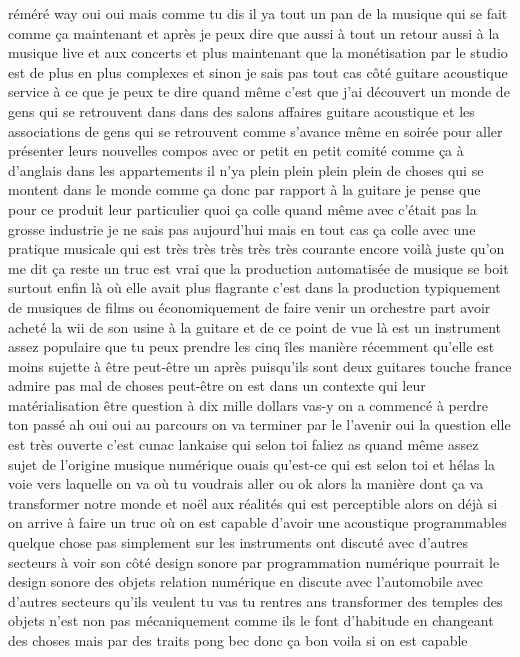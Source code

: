  réméré way oui oui mais comme tu dis il ya tout un pan de la musique qui se fait comme ça maintenant et après je peux dire que aussi à tout un retour aussi à la musique live et aux concerts et plus maintenant que la monétisation par le studio est de plus en plus complexes et sinon je sais pas tout cas côté guitare acoustique service à ce que je peux te dire quand même c'est que j'ai découvert un monde de gens qui se retrouvent dans dans des salons affaires guitare acoustique et les associations de gens qui se retrouvent comme s'avance même en soirée pour aller présenter leurs nouvelles compos avec or petit en petit comité comme ça à d'anglais dans les appartements il n'ya plein plein plein plein de choses qui se montent dans le monde comme ça donc par rapport à la guitare je pense que pour ce produit leur particulier quoi ça colle quand même avec c'était pas la grosse industrie je ne sais pas aujourd'hui mais en tout cas ça colle avec une pratique musicale qui est très très très très très courante encore voilà juste qu'on me dit ça reste un truc est vrai que la production automatisée de musique se boit surtout enfin là où elle avait plus flagrante c'est dans la production typiquement de musiques de films ou économiquement de faire venir un orchestre part avoir acheté la wii de son usine à la guitare et de ce point de vue là est un instrument assez populaire que tu peux prendre les cinq îles manière récemment qu'elle est moins sujette à être peut-être un après puisqu'ils sont deux guitares touche france admire pas mal de choses peut-être on est dans un contexte qui leur matérialisation être question à dix mille dollars vas-y on a commencé à perdre ton passé ah oui oui au parcours on va terminer par le l'avenir oui la question elle est très ouverte c'est cunac lankaise qui selon toi faliez as quand même assez sujet de l'origine musique numérique ouais qu'est-ce qui est selon toi et hélas la voie vers laquelle on va où tu voudrais aller ou ok alors la manière dont ça va transformer notre monde et noël aux réalités qui est perceptible alors on déjà si on arrive à faire un truc où on est capable d'avoir une acoustique programmables quelque chose pas simplement sur les instruments ont discuté avec d'autres secteurs à voir son côté design sonore par programmation numérique pourrait le design sonore des objets relation numérique en discute avec l'automobile avec d'autres secteurs qu'ils veulent tu vas tu rentres ans transformer des temples des objets n'est non pas mécaniquement comme ils le font d'habitude en changeant des choses mais par des traits pong bec donc ça bon voila si on est capable 

